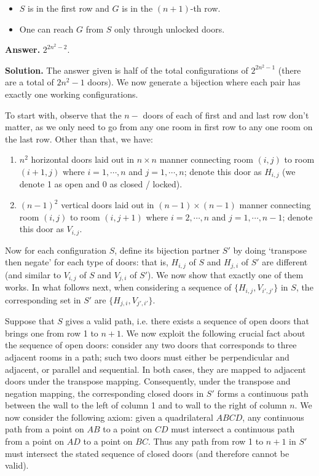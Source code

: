 \documentclass[11pt,a4paper]{article}
\begin{document}
	\begin{itemize}
		\item $S$ is in the first row and $G$ is in the $(n+1)$-th row.
		
		\item One can reach $G$ from $S$ only through unlocked doors.
	\end{itemize}
	
	\textbf{Answer.} $2^{2n^2-2}$. 
	
	\textbf{Solution.} The answer given is half of the total configurations of $2^{2n^2-1}$ (there are a total of $2n^2-1$ doors). 
	We now generate a bijection where each pair has exactly one working configurations. 
	
	To start with, observe that the $n - $ doors of each of first and and last row don't matter, as we only need to go from any one room in first row to any one room on the last row. 
	Other than that, we have: 
	\begin{enumerate}
		\item $n^2$ horizontal doors laid out in $n\times n$ manner connecting room $(i, j)$ to room $(i + 1, j)$ where $i=1, \cdots, n$ and $j = 1, \cdots, n$; denote this door as $H_{i, j}$ (we denote 1 as open and 0 as closed / locked). 
		
		\item $(n-1)^2$ vertical doors laid out in $(n-1)\times (n-1)$ manner connecting room $(i, j)$ to room $(i, j + 1)$ where $i=2, \cdots, n$ and $j=1, \cdots, n - 1$; denote this door as $V_{i, j}$. 
	\end{enumerate}
    
    Now for each configuration $S$, define its bijection partner $S'$ by doing `transpose then negate' for each type of doors: 
    that is, $H_{i, j}$ of $S$ and $H_{j, i}$ of $S'$ are different (and similar to $V_{i, j}$ of $S$ and $V_{j, i}$ of $S'$). 
    We now show that exactly one of them works. In what follows next, when considering a sequence of $\{H_{i, j}, V_{i', j'}\}$ in $S$, the corresponding set in $S'$ are $\{H_{j, i}, V_{j', i'}\}$. 
    
    Suppose that $S$ gives a valid path, i.e. there exists a sequence of open doors that brings one from row 1 to $n + 1$. 
    We now exploit the following crucial fact about the sequence of open doors: consider any two doors that corresponds to three adjacent rooms in a path; such two doors must either be perpendicular and adjacent, 
    or parallel and sequential. 
    In both cases, they are mapped to adjacent doors under the transpose mapping. 
    Consequently, under the transpose and negation mapping, the corresponding closed doors in $S'$ forms a continuous path between the wall to the left of column 1 and to wall to the right of column $n$. 
    We now consider the following axiom: 
    given a quadrilateral $ABCD$, any continuous path from a point on $AB$ to a point on  $CD$ must intersect a continuous path from a point on  $AD$ to a point on $BC$. 
    Thus any path from row 1 to $n+1$ in $S'$ must intersect the stated sequence of closed doors (and therefore cannot be valid). 
    
\end{document}
